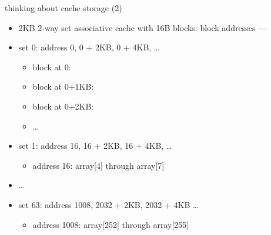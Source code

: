 \begin{frame}[fragile,label=thinkStorage2]{thinking about cache storage (2)}
    \begin{itemize}
    \item 2KB 2-way set associative cache with 16B blocks: block addresses --- 
    \item set 0: address 0, 0 + 2KB, 0 + 4KB, \ldots
        \begin{itemize}
        \item<2-> block at 0: 
        \item<3-> block at 0+1KB: 
        \item<3-> block at 0+2KB: 
        \item<3-> \ldots
        \end{itemize}
    \item set 1: address 16, 16 + 2KB, 16 + 4KB, \ldots \\
        \begin{itemize}
        \item<2-> address 16: array[4] through array[7]
        \end{itemize}
    \item \ldots
    \item set 63: address 1008, 2032 + 2KB, 2032 + 4KB \ldots
        \begin{itemize}
        \item<2-> address 1008: array[252] through array[255]
        \end{itemize}
    \end{itemize}
\end{frame}
